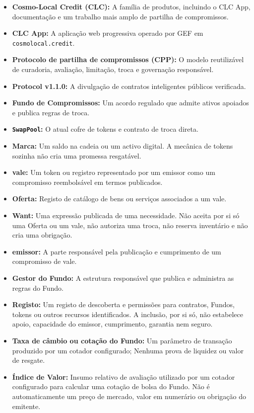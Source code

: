 \documentclass[11pt]{article}
\begin{document}
\begin{itemize}[leftmargin=*]
\item \textbf{Cosmo-Local Credit (CLC):} A família de produtos, incluindo o CLC App, documentação e um trabalho mais amplo de partilha de compromissos.
\item \textbf{CLC App:} A aplicação web progressiva operado por GEF em \texttt{cosmolocal.credit}.
\item \textbf{Protocolo de partilha de compromissos (CPP):} O modelo reutilizável de curadoria, avaliação, limitação, troca e governação responsável.
\item \textbf{Protocol v1.1.0:} A divulgação de contratos inteligentes públicos verificada.
\item \textbf{Fundo de Compromissos:} Um acordo regulado que admite ativos apoiados e publica regras de troca.
\item \textbf{\texttt{SwapPool}:} O atual cofre de tokens e contrato de troca direta.
\item \textbf{Marca:} Um saldo na cadeia ou um activo digital. A mecânica de tokens sozinha não cria uma promessa resgatável.
\item \textbf{vale:} Um token ou registro representado por um emissor como um compromisso reembolsável em termos publicados.
\item \textbf{Oferta:} Registo de catálogo de bens ou serviços associados a um vale.
\item \textbf{Want:} Uma expressão publicada de uma necessidade. Não aceita por si só uma Oferta ou um vale, não autoriza uma troca, não reserva inventário e não cria uma obrigação.
\item \textbf{emissor:} A parte responsável pela publicação e cumprimento de um compromisso de vale.
\item \textbf{Gestor do Fundo:} A estrutura responsável que publica e administra as regras do Fundo.
\item \textbf{Registo:} Um registo de descoberta e permissões para contratos, Fundos, tokens ou outros recursos identificados. A inclusão, por si só, não estabelece apoio, capacidade do emissor, cumprimento, garantia nem seguro.
\item \textbf{Taxa de câmbio ou cotação do Fundo:} Um parâmetro de transação produzido por um cotador configurado; Nenhuma prova de liquidez ou valor de resgate.
\item \textbf{Índice de Valor:} Insumo relativo de avaliação utilizado por um cotador configurado para calcular uma cotação de bolsa do Fundo. Não é automaticamente um preço de mercado, valor em numerário ou obrigação do emitente.

\end{itemize}
\end{document}
